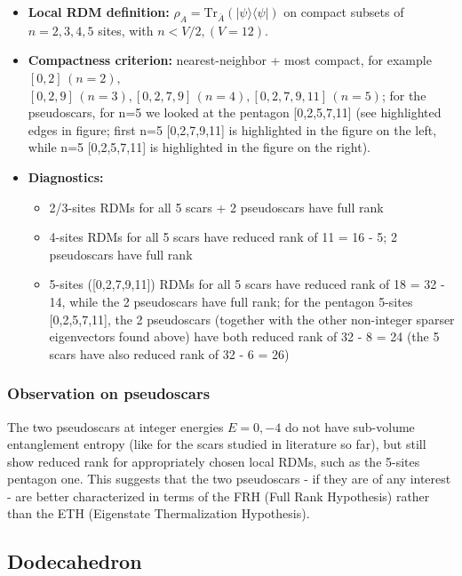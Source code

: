 \documentclass[11pt,a4paper]{article}
\begin{document}
\begin{itemize}[leftmargin=1.5em]
  \item \textbf{Local RDM definition:} $\rho_A=\mathrm{Tr}_{\bar A}(|\psi\rangle\langle\psi|)$ on compact subsets of $n=2,3,4,5$ sites, with $n < V/2, (V=12)$.
  \item \textbf{Compactness criterion:} nearest-neighbor + most compact, for example $[0,2] \, (n = 2),$ \\ $[0,2,9] \, (n = 3), [0,2,7,9] \,  (n = 4), [0,2,7,9,11] \, (n = 5)$; for the pseudoscars, for n=5 we looked at the pentagon [0,2,5,7,11] (see highlighted edges in figure; first n=5 [0,2,7,9,11] is highlighted in the figure on the left, while n=5 [0,2,5,7,11] is highlighted in the figure on the right).
  \item \textbf{Diagnostics:} \begin{itemize} \item 2/3-sites RDMs for all 5 scars + 2 pseudoscars have full rank \item 4-sites RDMs for all 5 scars have reduced rank of 11 = 16 - 5; 2 pseudoscars have full rank \item 5-sites ([0,2,7,9,11]) RDMs for all 5 scars have reduced rank of 18 = 32 - 14, while the 2 pseudoscars have full rank; for the pentagon 5-sites [0,2,5,7,11], the 2 pseudoscars (together with the other non-integer sparser eigenvectors found above) have both reduced rank of 32 - 8 = 24 (the 5 scars have also reduced rank of 32 - 6 = 26)\end{itemize}
\end{itemize}

\subsubsection*{Observation on pseudoscars}

The two pseudoscars at integer energies $E=0,-4$ do not have sub-volume entanglement entropy (like for the scars studied in literature so far), but still show reduced rank for appropriately chosen local RDMs, such as the 5-sites pentagon one. This suggests that the two pseudoscars - if they are of any interest - are better characterized in terms of the FRH (Full Rank Hypothesis) rather than the ETH (Eigenstate Thermalization Hypothesis).


\subsection*{Dodecahedron}
\end{document}
